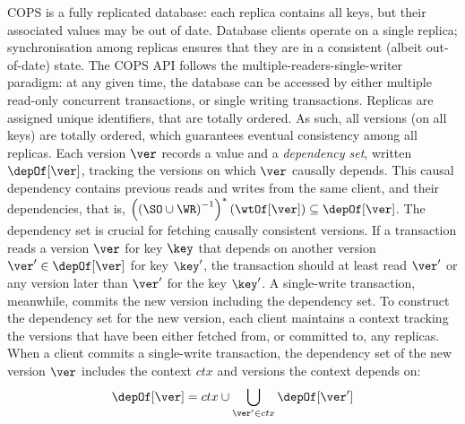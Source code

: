 COPS is a fully replicated database: each replica contains all keys, but their associated values may be out of date.
Database clients operate on a single replica; 
synchronisation among replicas ensures that they are in a consistent (albeit out-of-date) state.
The COPS API follows the multiple-readers-single-writer paradigm: 
at any given time, the database can be accessed by either multiple read-only concurrent transactions, or single writing transactions. 
Replicas are assigned unique identifiers, that are totally ordered.
As such, all versions (on all keys) are totally ordered,
which guarantees eventual consistency among all replicas.
Each version $\ver$ records a value and a \emph{dependency set}, written $\depOf[\ver]$,
tracking the versions on which $\ver$ causally depends.
This causal dependency contains previous reads and writes from the same client, and their dependencies,
that is, 
\( \left( \left( \SO \cup \WR \right) ^{-1}\right)^{*}(\wtOf[\ver]) \subseteq \depOf[\ver] \).
The dependency set is crucial for fetching causally consistent versions.
If a transaction reads a version \( \ver \) for key \( \key \) that 
depends on another version \( \ver' \in \depOf[\ver]\) for key \( \key' \), 
the transaction should at least read \( \ver' \) or any version later than \( \ver' \) for the key \( \key' \).
A single-write transaction, meanwhile, commits the new version including the dependency set.
To construct the dependency set for the new version,
each client maintains a context tracking the versions that have been either fetched from, or committed to, any replicas.
When a client commits a single-write transaction,
the dependency set of the new version \( \ver \) includes the context \( ctx \) and versions the context depends on:
\[
    \depOf[\ver]  = ctx \cup \bigcup_{\ver' \in ctx} \depOf[\ver']
\]

